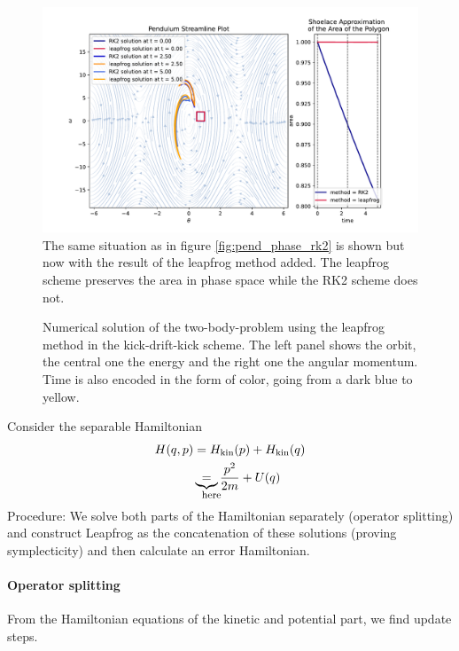 \begin{figure}[!htb]
  \centering
  \includegraphics[width=1\textwidth]{figures/phase_spaceA.pdf}\hfill
  \caption{The same situation as in figure \ref{fig:pend_phase_rk2} is shown but now with the result of the leapfrog method added. The leapfrog scheme preserves the area in phase space while the RK2 scheme does not.}
  \label{fig:pend_phase_lf}
\end{figure}

\begin{figure}[!htb]
  \centering
  \hfill
  \caption{Numerical solution of the two-body-problem using the leapfrog method in the kick-drift-kick scheme. The left panel shows the orbit, the central one the energy and the right one the angular momentum. Time is also encoded in the form of color, going from a dark blue to yellow.}
  \label{fig:leapfrog_orbit}
\end{figure}

Consider the separable Hamiltonian
\begin{equation}
  \begin{aligned}
    H(q,p) &= H_{\text{kin}}(p) + H_{\text{kin}}(q) \\
           &\explain{=}{here} \frac{p^2}{2m} + U(q)
  \end{aligned}
\end{equation}
\textcolor{blue1}{Procedure}: We solve both parts of the Hamiltonian separately (operator splitting) and construct Leapfrog as
the concatenation of these solutions (proving symplecticity) and then calculate an error Hamiltonian.

\paragraph{Operator splitting} From the Hamiltonian equations of the kinetic and potential part, we find update steps.

